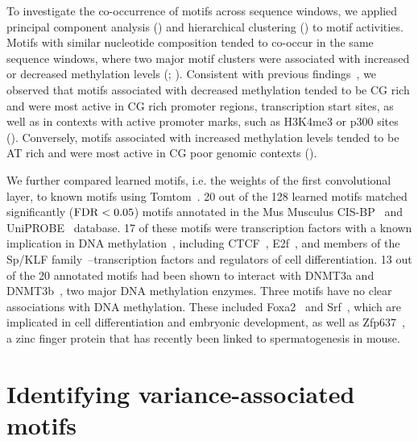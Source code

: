 To investigate the co-occurrence of motifs across sequence windows, we applied principal component analysis () and hierarchical clustering () to motif activities.  Motifs with similar nucleotide composition tended to co-occur in the same sequence windows, where two major motif clusters were associated with increased or decreased methylation levels (; ). Consistent with previous findings~\citep{mendenhall_gc-rich_2010,thomson_cpg_2010,whitaker_predicting_2015}, we observed that motifs associated with decreased methylation tended to be CG rich and were most active in CG rich promoter regions, transcription start sites, as well as in contexts with active promoter marks, such as H3K4me3 or p300 sites (). Conversely, motifs associated with increased methylation levels tended to be AT rich and were most active in CG poor genomic contexts ().

We further compared learned motifs, i.e. the weights of the first convolutional layer, to known motifs using Tomtom~\citep{bailey_meme_2009}. 20 out of the 128 learned motifs matched significantly ($\operatorname{FDR}<0.05$) motifs annotated in the Mus Musculus CIS-BP~\citep{weirauch_determination_2014} and UniPROBE~\citep{newburger_uniprobe:_2009} database. 17 of these motifs were transcription factors with a known implication in DNA methylation~\citep{hervouet_dnmt3/transcription_2009,luu_disclosing_2013,whitaker_predicting_2015}, including CTCF~\citep{kim_analysis_2007}, E2f~\citep{tsai_mouse_2008}, and members of the Sp/KLF family~\citep{fernandez-zapico_functional_2011}--transcription factors and regulators of cell differentiation. 13 out of the 20 annotated motifs had been shown to interact with DNMT3a and DNMT3b~\citep{hervouet_dnmt3/transcription_2009}, two major DNA methylation enzymes. Three motifs have no clear associations with DNA methylation. These included Foxa2~\citep{lee_foxa2_2005,wan_compensatory_2005} and Srf~\citep{arsenian_serum_1998,marais_srf_1993}, which are implicated in cell differentiation and embryonic development, as well as Zfp637~\citep{huang_il-6_2016,quenneville_embryonic_2011}, a zinc finger protein that has recently been linked to spermatogenesis in mouse.


\section{Identifying variance-associated motifs}

